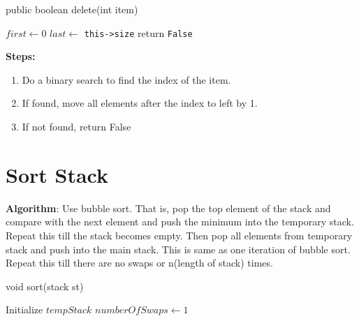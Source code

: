 \documentclass{article}
\begin{document}
\begin{algorithm}[H]
  \caption{public boolean delete(int item)}\label{alg:1.4}
  \DontPrintSemicolon
  $first \gets 0$\;
  $last \gets$ \verb~this->size~\;
  return \verb~False~\;
\end{algorithm}

\textbf{Steps:}
\begin{enumerate}
\item Do a binary search to find the index of the item.
\item If found, move all elements after the index to left by 1.
\item If not found, return False
\end{enumerate}

\pagebreak
\section{Sort Stack}
\label{sec:2}

\textbf{Algorithm}:
Use bubble sort. That is, pop the top element of the stack and compare with the next element and push the minimum into the temporary stack. Repeat this till the stack becomes empty. Then pop all elements from temporary stack and push into the main stack. This is same as one iteration of bubble sort. Repeat this till there are no swaps or n(length of stack) times.

\begin{algorithm}[H]
  \caption{void sort(stack st)}\label{alg:2}
  \DontPrintSemicolon
  Initialize $tempStack$\;
  $numberOfSwaps \gets 1$\;
\end{algorithm}

\pagebreak
\end{document}
